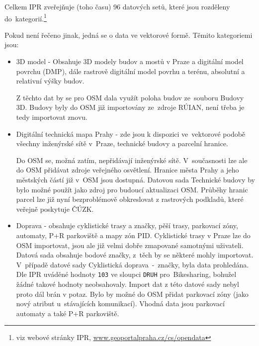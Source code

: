 Celkem IPR zveřejňuje (toho času) 96 datových setů, které jsou rozděleny
do~kategorií.\footnote{viz webové stránky IPR, \url{www.geoportalpraha.cz/cs/opendata}}

Pokud není řečeno jinak, jedná se o data ve vektorové formě.
Těmito kategoriemi jsou:

\begin{itemize}
    \item   3D model - Obsahuje 3D modely budov a mostů v Praze a
            digitální model povrchu (DMP), dále rastrově digitální
            model povrhu a terénu, absolutní a relativní výšky budov.

            Z těchto dat by se pro OSM dala využít poloha budov
            ze~souboru Budovy 3D. Budovy byly do OSM již importovány
            ze~zdroje RÚIAN, není třeba je tedy importovat znovu.

    \item   Digitální technická mapa Prahy - zde jsou k dispozici
            ve~vektorové podobě všechny inženýrské sítě v~Praze,
            technické budovy a parcelní hranice.

            Do OSM se, možná zatím, nepřidávají inženýrské sítě.
            V~současnosti lze ale do OSM přidávat zdroje veřejného osvětlení.
            Hranice města Prahy a jeho městských
            částí již v~OSM jsou dostupná. Datovou sada Technické budovy by bylo
            možné použít jako zdroj pro budoucí aktualizaci OSM.
            Průběhy hranic parcel lze již nyní bezproblémově
            obkreslovat z rastrových podkladů, které veřejně
            poskytuje ČÚZK. 

    \item   Doprava - obsahuje cyklistické trasy a značky, pěší trasy,
            parkovací zóny, automaty, P+R parkoviště a mapy zón PID.
            Cyklistické trasy v Praze lze do OSM importovat, jsou ale
            již velmi dobře zmapované samotnými uživateli. Datová sada
            obsahuje bodové značky, z~těch by se některé mohly
            importovat. V~případě datové sady 
            Cyklistická doprava~-~značky, byla data prohledána. Dle IPR
            uváděné hodnoty {\tt 103} ve sloupci {\tt DRUH}
            pro~Bikesharing, bohužel žádné takové hodnoty
            neobsahovaly. Import dat z této datové sady nebyl proto
            dál brán v potaz. Bylo by možné do OSM přidat parkovací
            zóny (jako nový atribut u~stávajících komunikací).
            Vhodná data jsou parkovací automaty a také P+R parkoviště.


\end{itemize}

